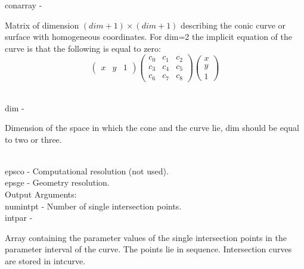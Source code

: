         \>\>    {\fov conarray}\> - \>  \begin{minipg2}
                                Matrix of dimension $(dim+1)\times(dim+1)$ describing
                                the conic curve or surface with homogeneous coordinates. For dim=2
                                the implicit equation of the curve is that the following is equal to zero:
                                \[ \left( \begin{array}{ccc} x & y & 1
                                \end{array} \right)
                                \left( \begin{array}{ccc} c_{0} & c_{1} & c_{2}\\
                                c_{3} & c_{4} & c_{5}\\ c_{6} & c_{7} & c_{8}
                                \end{array} \right)
                                \left( \begin{array}{c} x\\ y\\ 1
                                \end{array} \right) \]
                                \end{minipg2}\\[0.8ex]
        \>\>    {\fov dim}      \> - \> \begin{minipg2}
                                Dimension of the space in which the
                                cone and the curve
                                lie, {\fov dim} should be equal to two or three.
                                \end{minipg2}\\[0.3ex]
        \>\>    {\fov epsco}    \> - \> Computational resolution (not used).\\
        \>\>    {\fov epsge}    \> - \> Geometry resolution.\\
\newpagetabs
        \>Output Arguments:\\
        \>\>    {\fov numintpt}\> - \>  Number of single intersection points.\\
        \>\>    {\fov intpar}   \> - \> \begin{minipg2}
                        Array containing the parameter values of the
                        single intersection points in the parameter
                        interval of the curve. The points lie in sequence.
                        Intersection curves are stored in intcurve.
                                \end{minipg2}\\[0.8ex]
